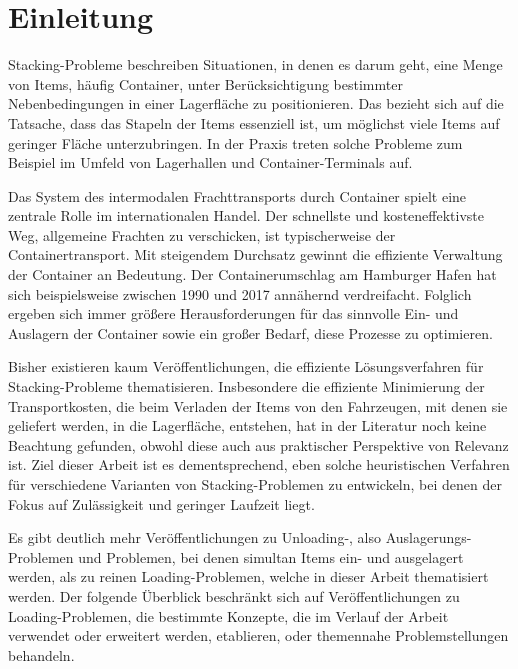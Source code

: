 \section{Einleitung}
\label{sec:einleitung}

Stacking-Probleme beschreiben Situationen, in denen es darum geht, eine Menge von Items, häufig Container,
unter Berücksichtigung bestimmter Nebenbedingungen in einer Lagerfläche zu positionieren. Das 
bezieht sich auf die Tatsache, dass das Stapeln der Items essenziell ist, um möglichst viele Items
auf geringer Fläche unterzubringen. In der Praxis treten solche Probleme zum Beispiel im Umfeld von Lagerhallen und Container-Terminals auf.


Das System des intermodalen Frachttransports durch Container spielt eine zentrale Rolle im internationalen Handel.
Der schnellste und kosteneffektivste Weg, allgemeine Frachten zu verschicken, ist typischerweise der Containertransport. \cite{Briskorn2018}
Mit steigendem Durchsatz gewinnt die effiziente Verwaltung der Container an Bedeutung.
Der Containerumschlag am Hamburger Hafen hat sich beispielsweise zwischen 1990 und 2017 annähernd verdreifacht. \cite{Port_of_Hamburg}
Folglich ergeben sich immer größere Herausforderungen für das sinnvolle Ein- und Auslagern der Container sowie
ein großer Bedarf, diese Prozesse zu optimieren.

Bisher existieren kaum Veröffentlichungen, die effiziente Lösungsverfahren für Stacking-Probleme thematisieren.
Insbesondere die effiziente Minimierung der Transportkosten, die beim Verladen der Items von den Fahrzeugen,
mit denen sie geliefert werden, in die Lagerfläche, entstehen, hat in der Literatur noch keine Beachtung gefunden,
obwohl diese auch aus praktischer Perspektive von Relevanz ist. Ziel dieser Arbeit ist es dementsprechend,
eben solche heuristischen Verfahren für verschiedene Varianten von Stacking-Problemen zu entwickeln, bei denen der Fokus auf
Zulässigkeit und geringer Laufzeit liegt.

Es gibt deutlich mehr Veröffentlichungen zu Unloading-, also Auslagerungs-Problemen und Problemen, bei denen simultan Items
ein- und ausgelagert werden, als zu reinen Loading-Problemen, welche in dieser Arbeit thematisiert werden.
Der folgende Überblick beschränkt sich auf Veröffentlichungen zu Loading-Problemen, die bestimmte Konzepte,
die im Verlauf der Arbeit verwendet oder erweitert werden, etablieren, oder themennahe Problemstellungen behandeln.

